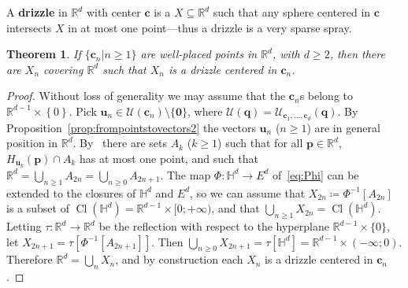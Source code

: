 \documentclass[12pt]{amsart}
\DeclareMathOperator{\Cl}{Cl} 		%
\newcommand{\R}{\mathbb{R}}	%
\newcommand{\markdef}[1]{\textbf{#1}} %
\newcommand{\Mid}{\boldsymbol\mid}			%
\newcommand{\set}[1]{\mathopen \{ {#1} \mathclose \}} %
\newcommand{\setof}[2]{\mathopen \{{#1}\Mid{#2} \mathclose\}} %
\newcommand{\setLR}[1]{\left \{ {#1} \right \}} %
\theoremstyle{plain}
\newtheorem{theorem}{Theorem}[section]
\theoremstyle{definition}
\theoremstyle{remark}
\begin{document}
A \markdef{drizzle} in \( \R^d \) with center \( \mathbf{c} \) is a \( X \subseteq \R^d \) such that any sphere centered in \( \mathbf{c} \) intersects \( X \) in at most one point---thus a drizzle is a very sparse spray.

\begin{theorem}\label{th:unionofcountablymanysprays}
If \( \setof{ \mathbf{c}_n }{ n \geq 1 } \) are well-placed points in \( \R^d \), with \( d \geq 2 \), then there are \( X_n \) covering \( \R^d \) such that \( X_n \) is a drizzle centered in \( \mathbf{c}_n \).
\end{theorem}

\begin{proof}
Without loss of generality we may assume that the \( \mathbf{c}_n \)s belong to \( \R^{ d - 1 } \times \setLR{0} \).
Pick \( \mathbf{u}_n \in \mathcal{U} ( \mathbf{c}_n ) \setminus \set{ \mathbf{0} } \), where \( \mathcal{U} ( \mathbf{q} ) = \mathcal{U}_{ \mathbf{c}_1 , \dots , \mathbf{c}_d } ( \mathbf{q} ) \).
By Proposition~\ref{prop:frompointstovectors2} the vectors \( \mathbf{u}_n \) (\( n \geq 1 \)) are in general position in \( \R^d \).
By~\cite{Davies:1974vn} there are sets \( A_k \) (\( k \geq 1 \)) such that for all \( \mathbf{p} \in \R^d \), \( H_{ \mathbf{u}_k } ( \mathbf{p} ) \cap A_k \) has at most one point, and such that \( \R^d = \bigcup_{n \geq 1 } A_{ 2 n } = \bigcup_{n \geq 0 } A_{ 2 n + 1 } \).
The map \( \Phi \colon \mathbb{H}^d \to E^d \) of~\eqref{eq:Phi} can be extended to the closures of \( \mathbb{H}^d \) and \( E^d \), so we can assume that \( X_{ 2 n } \coloneqq \Phi^{-1} [ A_{ 2 n } ] \) is a subset of \( \Cl ( \mathbb{H}^d ) = \R^{ d - 1} \times [ 0 ; + \infty ) \), and that \( \bigcup_{ n \geq 1 } X_{ 2 n } = \Cl ( \mathbb{H}^d ) \).
Letting \( \tau \colon \R^d \to \R^d \) be the reflection with respect to the hyperplane \( \R^{ d - 1 } \times \set{0} \), let \( X_{ 2 n + 1 } = \tau [ \Phi^{-1} [ A_{ 2 n + 1 } ] ] \).
Then \( \bigcup_{n \geq 0 } X_{ 2 n + 1 } = \tau[ \mathbb{H}^d ] = \R^{ d - 1 } \times ( - \infty ; 0 ) \).
Therefore \( \R^d = \bigcup_{n } X_n \), and by construction each \( X_n \) is a drizzle centered in \( \mathbf{c}_n \). 
\end{proof}

\printbibliography
\end{document}
